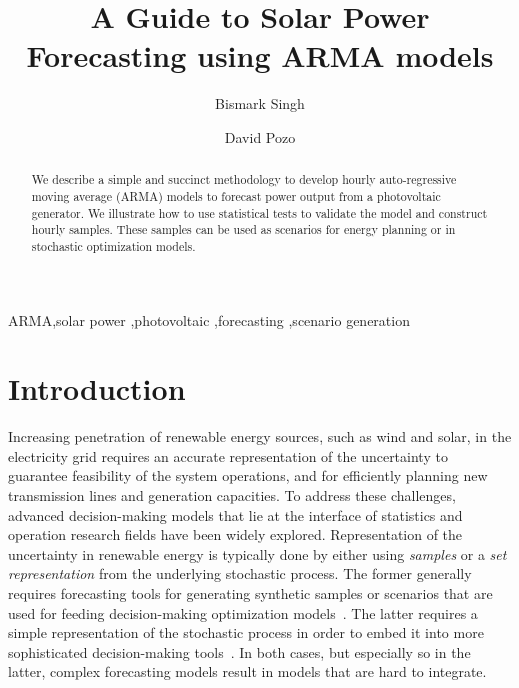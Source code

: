 \documentclass[review]{elsarticle}
\begin{document}
\begin{frontmatter}

\title{A Guide to Solar Power Forecasting using ARMA models}

\author{Bismark Singh}
\address{Discrete Mathematics \& Optimization, Sandia National Laboratories 
}


\author{David Pozo}
\address{Center for Energy Systems, Skolkovo Institute of Science and 
Technology}

\begin{abstract}
We describe a simple and succinct methodology to develop hourly auto-regressive 
moving 
average (ARMA) models to forecast power output from a photovoltaic generator. 
We illustrate how to use 
statistical tests to validate the model and construct hourly samples. These 
samples can be used as scenarios for energy planning or in stochastic 
optimization models.
\end{abstract}

\begin{keyword}
ARMA\sep solar power \sep photovoltaic \sep forecasting \sep scenario 
generation
\end{keyword}

\end{frontmatter}

\linenumbers

\section{Introduction}
Increasing penetration of renewable energy sources, such as wind and solar, in 
the electricity grid requires an accurate representation of the 
uncertainty to guarantee feasibility of the system operations, and 
for efficiently planning new transmission lines and generation capacities. To 
address these challenges, advanced decision-making models that lie at the
interface of statistics and operation research fields have been widely 
explored.  Representation of the  uncertainty in renewable energy is typically  
done by either using \textit{samples} or a  \textit{set representation} from the 
 underlying stochastic process. The former generally requires forecasting tools 
for generating synthetic samples or scenarios that are used for feeding 
decision-making optimization models~\cite{kleywegt2002sample}. The latter 
requires a simple representation of the stochastic process in 
order to embed it into more sophisticated decision-making 
tools~\cite{lorca2015adaptive}. In both cases, but especially so in the latter, 
complex forecasting models result in models that are hard to integrate. 
\end{document}
